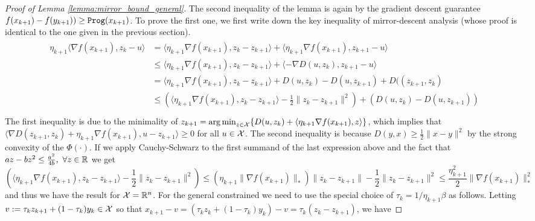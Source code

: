 \begin{proof}[Proof of Lemma \ref{lemma:mirror_bound_general}]
    The second inequality of the lemma is again by the gradient descent guarantee $f(x_{k+1}) - f(y_{k+1})) \geq {\tt{Prog}}(x_{k+1})$. To prove the first one, we first write down the key inequality of mirror-descent analysis (whose proof is identical to the one given in the previous section). 
\begin{align*}
    \begin{aligned}
        \eta_{k+1} \langle \nabla f(x_{k+1}), z_{k} - u \rangle &= \langle \eta_{k+1} \nabla f(x_{k+1}), z_k - z_{k+1} \rangle + \langle \eta_{k+1} \nabla f(x_{k+1}), z_{k+1} - u \rangle \\
                                                                &\leq  \langle \eta_{k+1} \nabla f(x_{k+1}), z_k - z_{k+1} \rangle + \langle -\nabla D(u, {z_k}), z_{k+1} - u \rangle \\
                                                                &=  \langle \eta_{k+1} \nabla f(x_{k+1}), z_k - z_{k+1} \rangle + D(u, {z_k}) - D(u, z_{k+1}) + D((z_{k+1}, {z_k}) \\
                                                                &\leq  \left( \langle \eta_{k+1} \nabla f(x_{k+1}), z_k - z_{k+1} \rangle - \frac{1}{2}\|z_k - z_{k+1}\|^2 \right)  +  \left( D(u, {z_k}) - D(u, z_{k+1}) \right) \\
    \end{aligned}
\end{align*}
The first inequality is due to the minimality of $z_{k+1} = \operatorname*{arg\,min}_{z\in\mathcal{X}} \{D(u, {z_k}) + \langle \eta_{k+1} \nabla f(x_{k+1}), z \rangle\}$, which implies that  $\langle \nabla D(z_{k+1}, {z_k} ) + \eta_{k+1} \nabla f(x_{k+1}), u-z_{k+1} \rangle \geq 0 $ for all $u \in \mathcal{X}$. The second inequality is because $D(y, x) \geq \frac{1}{2} \|x-y\|^2$ by the strong convexity of the $\Phi(\cdot)$. If we apply Cauchy-Schwarz to the first summand of the last expression above and the fact that $az-bz^2 \leq \frac{a^2}{4b}, \ \forall z \in \mathbb{R}$ we get
\[
    \left( \langle \eta_{k+1} \nabla f(x_{k+1}), z_k - z_{k+1} \rangle - \frac{1}{2}\|z_k - z_{k+1}\|^2 \right) \leq \left(\eta_{k+1}\|\nabla f(x_{k+1})\|_\ast \right) \|z_k - z_{k+1}\| - \frac{1}{2}\|z_k - z_{k+1}\|^2 \leq \frac{\eta_{k+1}^2}{2} \|\nabla f(x_{k+1})\|_\ast^2
\]
and thus we have the result for $\mathcal{X} = \mathbb{R}^n$. For the general constrained we need to use the special choice of $\tau_k = 1/\eta_{k+1} \beta$ as follows. Letting $v:= \tau_k z_{k+1} + (1-\tau_k) y_k \in \mathcal{X}$ so that $x_{k+1} - v = (\tau_k z_k + (1-\tau_k)y_k) -v = \tau_k(z_k-z_{k+1})$, we have

\end{proof}
